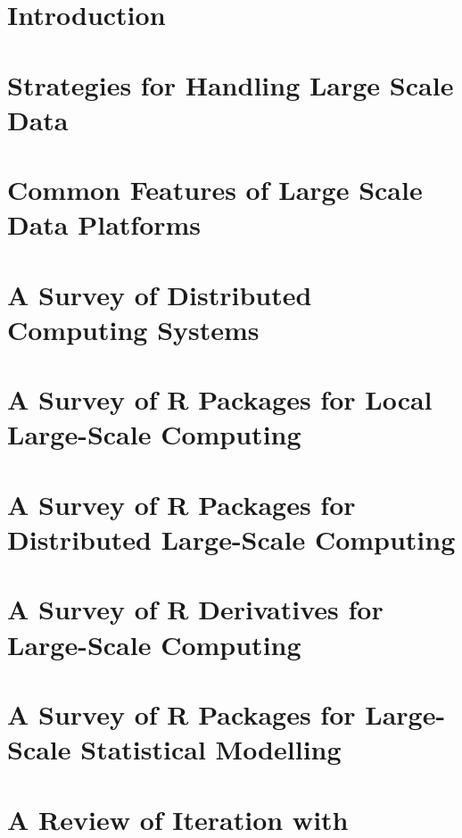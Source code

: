 \section{Introduction}\label{sec:lit-review-intro}

\section{Strategies for Handling Large Scale Data}\label{sec:lit-review-strategies}

\section{Common Features of Large Scale Data Platforms}\label{sec:large-scale-features}

\section{A Survey of Distributed Computing Systems}\label{sec:survey-dist-comp-sys}

\section{A Survey of R Packages for Local Large-Scale Computing}\label{sec:survey-r-local-packages}

\section{A Survey of R Packages for Distributed Large-Scale Computing}\label{sec:survey-r-dist-packages}

\section{A Survey of R Derivatives for Large-Scale Computing}\label{sec:survey-r-deriv}

\section{A Survey of R Packages for Large-Scale Statistical Modelling}\label{sec:survey-r-stat-model-packages}

\section{A Review of Iteration with }\label{sec:review-iteration-sparklyr}


